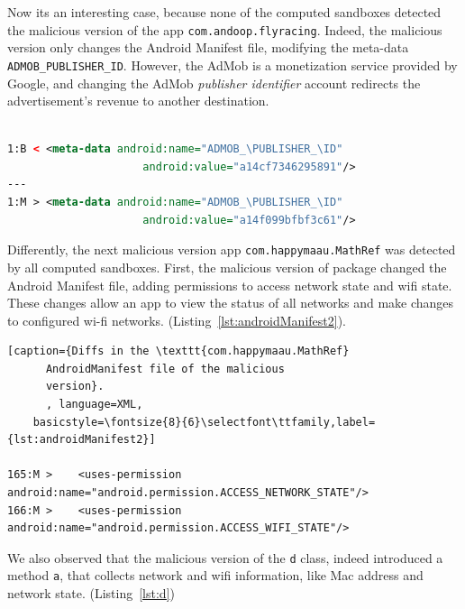 
Now its an interesting case, because none of the computed sandboxes detected the malicious version of the app \texttt{com.andoop.flyracing}. Indeed, the malicious version only changes the Android Manifest file, modifying the meta-data \texttt{ADMOB\_PUBLISHER\_ID}. However, the AdMob is a monetization service provided by Google, and changing the AdMob \emph{publisher identifier} account redirects the advertisement's revenue to another destination. 

\begin{lstlisting}[caption={Diff in the file \texttt{com.andoop.flyracing}
      AndroidManifest file of the malicious version.
      \texttt{B} stands for
      the benign version, while \texttt{M} stands for the malign version.}, language=XML,
    basicstyle=\fontsize{8}{6}\selectfont\ttfamily,label={lst:app65b}]

1:B < <meta-data android:name="ADMOB_\PUBLISHER_\ID"
                     android:value="a14cf7346295891"/>
---
1:M > <meta-data android:name="ADMOB_\PUBLISHER_\ID"
                     android:value="a14f099bfbf3c61"/>
\end{lstlisting}

Differently, the next malicious version app \texttt{com.happymaau.MathRef} was detected by all computed sandboxes. First, the malicious version of package changed the Android Manifest file, adding permissions to access network state and wifi state. These changes allow an app to view the status of all networks and make changes to configured wi-fi networks. (Listing~\ref{lst:androidManifest2}). 


\begin{lstlisting}[caption={Diffs in the \texttt{com.happymaau.MathRef}
      AndroidManifest file of the malicious
      version}.
      , language=XML,
    basicstyle=\fontsize{8}{6}\selectfont\ttfamily,label={lst:androidManifest2}]

165:M >    <uses-permission android:name="android.permission.ACCESS_NETWORK_STATE"/>
166:M >    <uses-permission android:name="android.permission.ACCESS_WIFI_STATE"/>
\end{lstlisting}


We also observed that the malicious version of the \texttt{d} class, indeed introduced a method \texttt{a}, that collects network and wifi information, like Mac address and network state. (Listing~\ref{lst:d})


